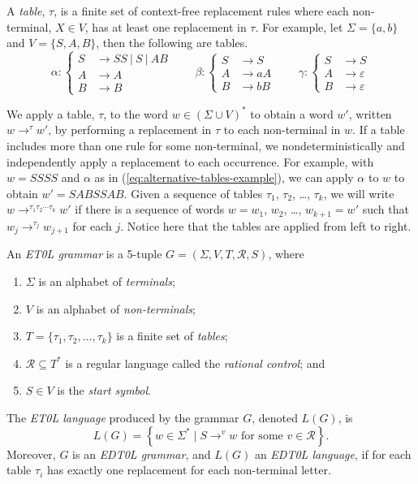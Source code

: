 A \emph{table}, $\tau$, is a finite set of context-free replacement rules where each non-terminal, $X \in V$, has at least one replacement in $\tau$.
For example, let $\Sigma = \{a,b\}$ and $V = \{S,A,B\}$, then the following are tables.
\begin{equation}\label{eq:alternative-tables-example}
	\alpha \colon
	\left\{
	\begin{aligned}
		S &\to SS \ \vert \ S \ \vert \ AB\\
		A &\to A\\
		B &\to B
	\end{aligned}
	\right.
	\qquad
	\beta \colon
	\left\{
	\begin{aligned}
		S &\to S\\
		A &\to aA\\
		B &\to bB
	\end{aligned}
	\right.
	\qquad
	\gamma \colon
	\left\{
	\begin{aligned}
		S &\to S \\
		A &\to \varepsilon \\
		B &\to \varepsilon
	\end{aligned}
	\right.
\end{equation}

We apply a table, $\tau$, to the word  $w \in (\Sigma \cup V)^*$ to obtain a word $w'$, written $w \to^\tau w'$, by performing a replacement in $\tau$ to each non-terminal in $w$.
If a table includes more than one rule for some non-terminal, we nondeterministically and independently apply a replacement to each occurrence.
For example, with $w = SSSS$ and $\alpha$ as in (\ref{eq:alternative-tables-example}), we can apply $\alpha$ to $w$ to obtain $w' = SABSSAB$.
Given a sequence of tables $\tau_1$, $\tau_2$, \dots, $\tau_k$, we will write $w \to^{\tau_1 \tau_2 \cdots \tau_k} w'$ if there is a sequence of words $w = w_1$, $w_2$, \dots, $w_{k+1} = w'$ such that $w_{j} \to^{\tau_j} w_{j+1}$ for each $j$.
Notice here that the tables are applied from left to right.

\begin{definition}\label{def:et0l grammar}
	An \emph{ET0L grammar} is a 5-tuple $G = (\Sigma, V, T, \mathcal{R}, S)$, where
	\begin{enumerate}
		\item $\Sigma$ is an alphabet of \emph{terminals};
		\item $V$ is an alphabet of \emph{non-terminals};
		\item $T = \{\tau_1, \tau_2 ,\dots, \tau_k\}$ is a finite set of \emph{tables};
		\item $\mathcal{R} \subseteq T^*$ is a regular language called the \emph{rational control}; and
		\item $S \in V$ is the \emph{start symbol}.
	\end{enumerate}
	The \emph{ET0L language} produced by the grammar $G$, denoted $L(G)$, is 
	\[
		L(G)
		=
		\left\{
			w \in \Sigma^*
		\mid 
			S \to^{v} w
			\text{ for some }
			v \in \mathcal{R}
		\right\}.
	\]
	Moreover, $G$ is an \emph{EDT0L grammar}, and $L(G)$ an \emph{EDT0L language}, if for each table $\tau_i$ has exactly one replacement for each non-terminal letter.
\end{definition}

